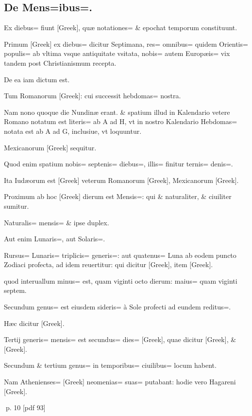 \subsection{De Mens=ibus=.}
\setcounter{parcount}{0}
\begin{parnumbers}

Ex diebus= fiunt [Greek], quæ notationes= \& epochat temporum constituunt.

Primum [Greek] ex diebus= dicitur Septimana, res= omnibus= quidem Orientis= populis= ab vltima vsque  antiquitate vsitata, nobis= autem Europæis= vix tandem post Christianismum recepta.

De ea iam dictum est.

Tum Romanorum [Greek]: cui successit hebdomas= nostra.

Nam nono quoque die Nundinæ erant. \& spatium illud in Kalendario vetere Romano notatum est literis= ab A ad H, vt in nostro Kalendario Hebdomas= notata est ab A ad G, inclusiue, vt loquuntur.

Mexicanorum [Greek] sequitur.

Quod enim spatium nobis= septenis= diebus=, illis= finitur ternis= denis=.

Ita Iudæorum est [Greek] veterum Romanorum [Greek], Mexicanorum [Greek].

Proximum ab hoc [Greek] dierum est Mensis=: qui \& naturaliter, \& ciuiliter sumitur.

Naturalis= mensis= \& ipse duplex.

 Aut enim Lunaris=, aut Solaris=.

Rursus= Lunaris= triplicis= generis=: aut quatenus= Luna ab eodem puncto Zodiaci profecta, ad idem reuertitur: qui dicitur [Greek], item [Greek].

quod interuallum minus= est, quam viginti octo dierum: maius= quam viginti septem.

Secundum genus= est eiusdem sideris= à Sole profecti ad eundem reditus=.

Hæc dicitur [Greek].

Tertij generis= mensis= est secundus= dies= [Greek], quae dicitur [Greek], \& [Greek].

Secundum \& tertium genus= in temporibus= ciuilibus= locum habent.

Nam Athenienses= [Greek] neomenias= suas= putabant: hodie vero Hagareni [Greek].

\end{parnumbers}
\clearpage
p. 10 [pdf 93]

